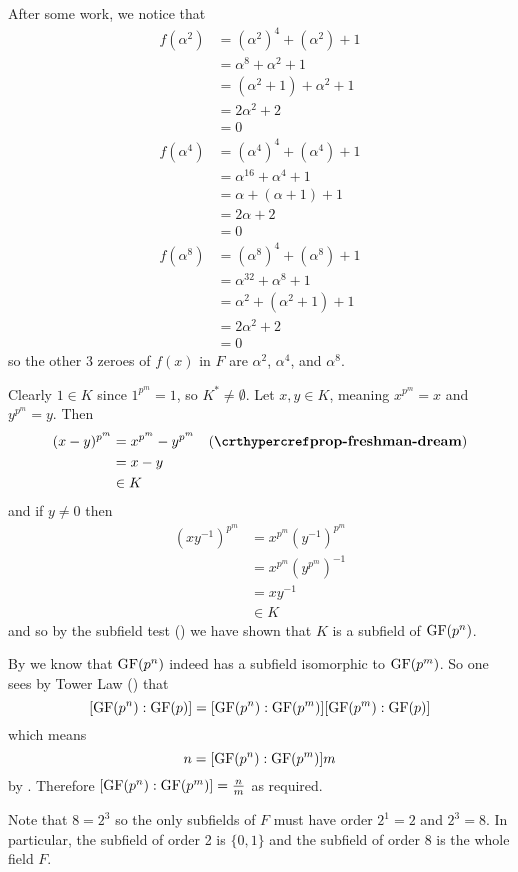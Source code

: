 \begin{questions}
    \item After some work, we notice that
    \begin{align*}
        f(\alpha^2) &= (\alpha^2)^4 + (\alpha^2) + 1\\
        &= \alpha^8 + \alpha^2 + 1\\
        &= (\alpha^2 + 1) + \alpha^2 + 1\\
        &= 2\alpha^2 + 2\\
        &= 0\\
        f(\alpha^4) &= (\alpha^4)^4 + (\alpha^4) + 1\\
        &= \alpha^{16} + \alpha^4 + 1\\
        &= \alpha + (\alpha + 1) + 1\\
        &= 2\alpha + 2\\
        &= 0\\
        f(\alpha^8) &= (\alpha^8)^4 + (\alpha^8) + 1\\
        &= \alpha^{32} + \alpha^8 + 1\\
        &= \alpha^2 + (\alpha^2 + 1) + 1\\
        &= 2\alpha^2 + 2\\
        &= 0
    \end{align*}
    so the other 3 zeroes of $f(x)$ in $F$ are $\alpha^2$, $\alpha^4$, and $\alpha^8$.

    \item Clearly $1 \in K$ since $1^{p^m} = 1$, so $K^\ast \neq \emptyset$. Let $x, y \in K$, meaning $x^{p^m} = x$ and $y^{p^m} = y$. Then
    \begin{align*}
        (x-y)^{p^m} &= x^{p^m} - y^{p^m} & (\myref{prop-freshman-dream})\\
        &= x - y\\
        &\in K
    \end{align*}
    and if $y \neq 0$ then
    \begin{align*}
        (xy^{-1})^{p^m} &= x^{p^m}\left(y^{-1}\right)^{p^m}\\
        &= x^{p^m}\left(y^{p^m}\right)^{-1}\\
        &= xy^{-1}\\
        &\in K
    \end{align*}
    and so by the subfield test () we have shown that $K$ is a subfield of $\mathrm{GF}(p^n)$.

    \item By  we know that $\mathrm{GF}(p^n)$ indeed has a subfield isomorphic to $\mathrm{GF}(p^m)$. So one sees by Tower Law () that
    \[
        [\mathrm{GF}(p^n):\mathrm{GF}(p)] = [\mathrm{GF}(p^n):\mathrm{GF}(p^m)][\mathrm{GF}(p^m):\mathrm{GF}(p)]
    \]
    which means
    \[
        n = [\mathrm{GF}(p^n):\mathrm{GF}(p^m)]m
    \]
    by . Therefore $[\mathrm{GF}(p^n):\mathrm{GF}(p^m)] = \frac nm$ as required.

    \item Note that $8 = 2^3$ so the only subfields of $F$ must have order $2^1 = 2$ and $2^3 = 8$. In particular, the subfield of order 2 is $\{0, 1\}$ and the subfield of order 8 is the whole field $F$.
\end{questions}
